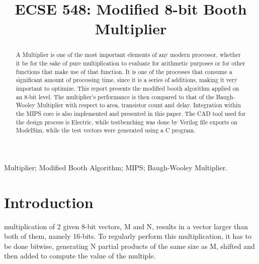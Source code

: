 \documentclass[conference]{IEEEtran}
\begin{document}
\title{ECSE 548: Modified 8-bit Booth Multiplier}
\author{
}

\maketitle
\IEEEpeerreviewmaketitle



\begin{abstract}
A Multiplier is one of the most important elements of any modern processor, whether it be for the sake of pure multiplication to evaluate for arithmetic purposes or for other functions that make use of that function. It is one of the processes that consume a significant amount of processing time, since it is a series of additions, making it very important to optimize. This report presents the modified booth algorithm applied on an 8-bit level. The multiplier’s performance is then compared to that of the Baugh-Wooley Multiplier with respect to area, transistor count and delay. Integration within the MIPS core is also implemented and presented in this paper. The CAD tool used for the design process is Electric, while testbenching was done by Verilog file exports on ModelSim, while the test vectors were generated using a C program.
\end{abstract}



\begin{IEEEkeywords}
Multiplier; Modified Booth Algorithm; MIPS; Baugh-Wooley Multiplier.
\end{IEEEkeywords}



\section{Introduction}
multiplication of 2 given 8-bit vectors, M and N, results in a vector larger than both of them, namely 16-bits. To regularly perform this multiplication, it has to be done bitwise, generating N partial products of the same size as M, shifted and then added to compute the value of the multiple.
\end{document}
